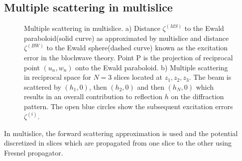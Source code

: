 \subsection{Multiple scattering in multislice}

\begin{figure}[h!]
\caption{Multiple scattering in multislice.
a) Distance $\zeta^{(MS)}$ to the Ewald paraboloid(solid curve) as approximated by
multislice and distance $\zeta^{(BW)}$ to the Ewald sphere(dashed curve) known as the
excitation error in the blochwave theory. Point P is the projection of
reciprocal point $(u_n,w_n)$ onto the Ewald paraboloid.
b) Multiple scattering in reciprocal space for $N=3$ slices located at $z_1, z_2, z_3$.
The beam is scattered by $(h_1,0)$, then $(h_2,0)$ and then $(h_N,0)$ which
results in an overall contribution to reflection $h$ on the diffraction pattern.
The open blue circles show the subsequent excitation errors $\zeta^{(i)}$.
}%
\end{figure}

In multislice, the forward scattering approximation is used and the
potential discretized in slices which are propagated from one slice to
the other using Fresnel propagator.

